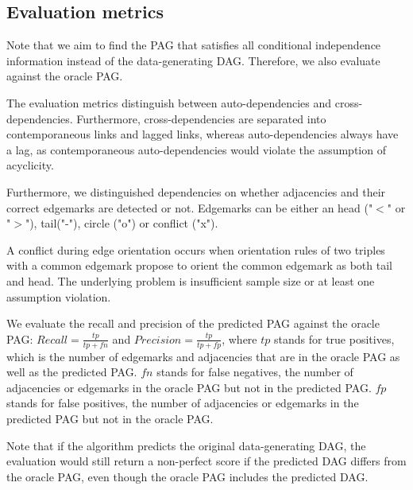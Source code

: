 \documentclass[conference]{IEEEtran}
\begin{document}
\subsection{Evaluation metrics}
Note that we aim to find the PAG that satisfies all conditional independence information instead of the data-generating DAG. Therefore, we also evaluate against the oracle PAG.

The evaluation metrics distinguish between auto-dependencies and cross-dependencies. 
Furthermore, cross-dependencies are separated into contemporaneous links and lagged links, whereas auto-dependencies always have a lag, as contemporaneous auto-dependencies would violate the assumption of acyclicity.

Furthermore, we distinguished dependencies on whether adjacencies and their correct edgemarks are detected or not. Edgemarks can be either an head ("$<$" or "$>$"), tail("-"), circle ("o") or conflict ("x").

A conflict during edge orientation occurs when orientation rules of two triples with a common edgemark propose to orient the common edgemark as both tail and head\cite{runge_pcmci_2020}. The underlying problem is insufficient sample size or at least one assumption violation\cite{runge_tigramite_2022}.


We evaluate the recall and precision of the predicted PAG against the oracle PAG:
$Recall = \frac{tp}{tp+fn}$ and $Precision = \frac{tp}{tp+fp}$, where
$tp$ stands for true positives, which is the number of edgemarks and adjacencies that are in the oracle PAG as well as the predicted PAG.
$fn$ stands for false negatives,  the number of adjacencies or edgemarks in the oracle PAG but not in the predicted PAG.
$fp$ stands for false positives, the number of adjacencies or edgemarks in the predicted PAG but not in the oracle PAG.

Note that if the algorithm predicts the original data-generating DAG, the evaluation would still return a non-perfect score if the predicted DAG differs from the oracle PAG, even though the oracle PAG includes the predicted DAG.
\end{document}
